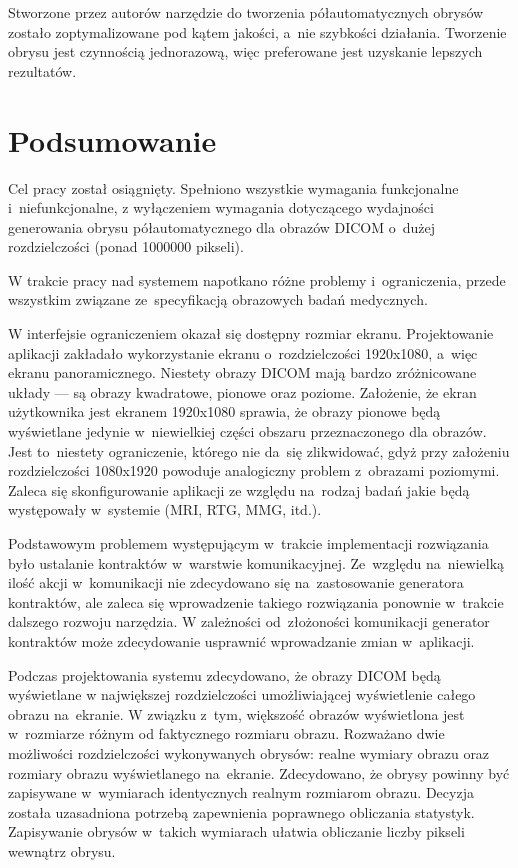 \documentclass[a4paper,11pt,twoside,openright]{report}
\newcommand\blankpage{%
    \null
    \thispagestyle{empty}%
    \newpage}
\theoremstyle{definition}
\begin{document}
Stworzone przez autorów narzędzie do tworzenia półautomatycznych obrysów zostało zoptymalizowane
pod kątem jakości, a~nie szybkości działania. Tworzenie obrysu jest czynnością jednorazową, więc
preferowane jest uzyskanie lepszych rezultatów.

\chapter {Podsumowanie}


Cel pracy został osiągnięty. Spełniono wszystkie wymagania funkcjonalne i~niefunkcjonalne,
z wyłączeniem wymagania dotyczącego wydajności generowania obrysu półautomatycznego
dla obrazów DICOM o~dużej rozdzielczości (ponad 1000000 pikseli).

W trakcie pracy nad systemem napotkano różne problemy i~ograniczenia, przede wszystkim
związane ze~specyfikacją obrazowych badań medycznych.

W interfejsie ograniczeniem okazał się dostępny rozmiar ekranu. Projektowanie
aplikacji zakładało wykorzystanie ekranu o~rozdzielczości 1920x1080, a~więc ekranu
panoramicznego. Niestety obrazy DICOM mają bardzo zróżnicowane układy --- są obrazy
kwadratowe, pionowe oraz poziome. Założenie, że ekran użytkownika jest ekranem
1920x1080 sprawia, że obrazy pionowe będą wyświetlane jedynie w~niewielkiej
części obszaru przeznaczonego dla obrazów. Jest to~niestety ograniczenie, którego
nie da~się zlikwidować, gdyż przy założeniu rozdzielczości 1080x1920 powoduje
analogiczny problem z~obrazami poziomymi. Zaleca się skonfigurowanie aplikacji
ze względu na~rodzaj badań jakie będą występowały w~systemie (MRI, RTG, MMG, itd.).


Podstawowym problemem występującym w~trakcie implementacji rozwiązania było
ustalanie kontraktów w~warstwie komunikacyjnej. Ze~względu na~niewielką ilość
akcji w~komunikacji nie zdecydowano się na~zastosowanie generatora kontraktów,
ale zaleca się wprowadzenie takiego rozwiązania ponownie w~trakcie dalszego rozwoju narzędzia.
W zależności od~złożoności komunikacji generator kontraktów może zdecydowanie
usprawnić wprowadzanie zmian w~aplikacji.

Podczas projektowania systemu zdecydowano, że obrazy DICOM będą wyświetlane w
największej rozdzielczości umożliwiającej wyświetlenie całego obrazu na~ekranie.
W związku z~tym, większość obrazów wyświetlona jest w~rozmiarze różnym od
faktycznego rozmiaru obrazu. Rozważano dwie możliwości rozdzielczości wykonywanych
obrysów: realne wymiary obrazu oraz rozmiary obrazu wyświetlanego na~ekranie.
Zdecydowano, że obrysy powinny być zapisywane w~wymiarach identycznych realnym
rozmiarom obrazu. Decyzja została uzasadniona potrzebą zapewnienia poprawnego
obliczania statystyk. Zapisywanie obrysów w~takich wymiarach ułatwia obliczanie
liczby pikseli wewnątrz obrysu.
\end{document}
